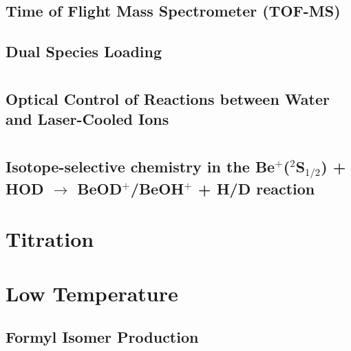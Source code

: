 \documentclass [PhD,nolistoftables,scheader] {uclathes}
\begin{document}
	\section{Time of Flight Mass Spectrometer (TOF-MS)}
	
	
	\section{Dual Species Loading}
	

\chapter{}
	\section{Optical Control of Reactions between Water and Laser-Cooled  Ions}
	

\chapter{}
	\section{Isotope-selective chemistry in the Be$^+$($^2$S$_{1/2}$) + HOD $\rightarrow$ BeOD$^+$/BeOH$^+$ + H/D reaction}
	

\chapter{ Titration}
	\section{}
	
	
	\section{}
	

\chapter{Low Temperature }
	\section{Formyl Isomer Production}
	
\end{document}
